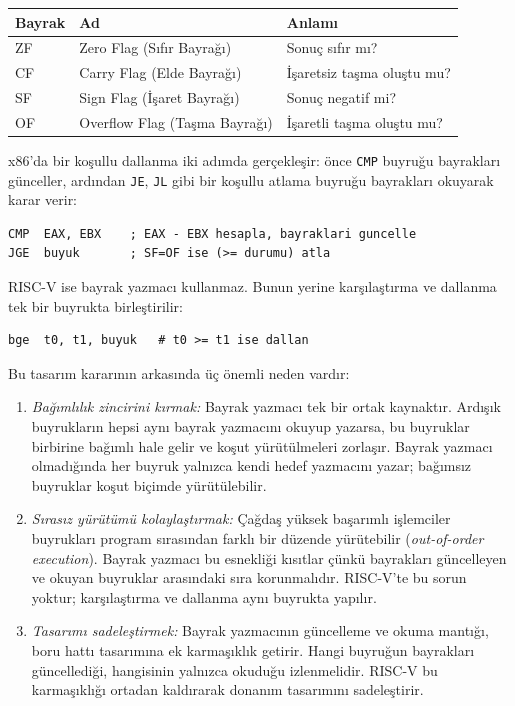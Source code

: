 \begin{center}
\small
\begin{tabular}{lll}
\toprule
Bayrak & Ad & Anlamı \\
\midrule
ZF & Zero Flag (Sıfır Bayrağı) & Sonuç sıfır mı? \\
CF & Carry Flag (Elde Bayrağı) & İşaretsiz taşma oluştu mu? \\
SF & Sign Flag (İşaret Bayrağı) & Sonuç negatif mi? \\
OF & Overflow Flag (Taşma Bayrağı) & İşaretli taşma oluştu mu? \\
\bottomrule
\end{tabular}
\end{center}

x86'da bir koşullu dallanma iki adımda gerçekleşir: önce \texttt{CMP} buyruğu bayrakları günceller, ardından \texttt{JE}, \texttt{JL} gibi bir koşullu atlama buyruğu bayrakları okuyarak karar verir:

\begin{lstlisting}[language={[x86masm]Assembler}, style=alistirma-kod]
CMP  EAX, EBX    ; EAX - EBX hesapla, bayraklari guncelle
JGE  buyuk       ; SF=OF ise (>= durumu) atla
\end{lstlisting}

RISC-V ise bayrak yazmacı kullanmaz. Bunun yerine karşılaştırma ve dallanma tek bir buyrukta birleştirilir:

\begin{lstlisting}[style=riscv]
bge  t0, t1, buyuk   # t0 >= t1 ise dallan
\end{lstlisting}

Bu tasarım kararının arkasında üç önemli neden vardır:

\begin{enumerate}
\item \emph{Bağımlılık zincirini kırmak:} Bayrak yazmacı tek bir ortak kaynaktır. Ardışık buyrukların hepsi aynı bayrak yazmacını okuyup yazarsa, bu buyruklar birbirine bağımlı hale gelir ve koşut yürütülmeleri zorlaşır. Bayrak yazmacı olmadığında her buyruk yalnızca kendi hedef yazmacını yazar; bağımsız buyruklar koşut biçimde yürütülebilir.

\item \emph{Sırasız yürütümü kolaylaştırmak:} Çağdaş yüksek başarımlı işlemciler buyrukları program sırasından farklı bir düzende yürütebilir (\emph{out-of-order execution}). Bayrak yazmacı bu esnekliği kısıtlar çünkü bayrakları güncelleyen ve okuyan buyruklar arasındaki sıra korunmalıdır. RISC-V'te bu sorun yoktur; karşılaştırma ve dallanma aynı buyrukta yapılır.

\item \emph{Tasarımı sadeleştirmek:} Bayrak yazmacının güncelleme ve okuma mantığı, boru hattı tasarımına ek karmaşıklık getirir. Hangi buyruğun bayrakları güncellediği, hangisinin yalnızca okuduğu izlenmelidir. RISC-V bu karmaşıklığı ortadan kaldırarak donanım tasarımını sadeleştirir.
\end{enumerate}

